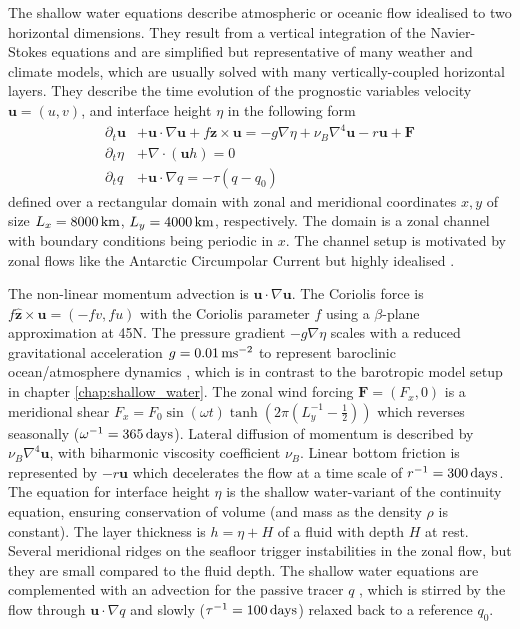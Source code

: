 The shallow water equations describe atmospheric or oceanic flow idealised to two horizontal dimensions. They result from
a vertical integration of the Navier-Stokes equations \citep{Gill1982,Vallis2006} and are simplified but representative of many
weather and climate models, which are usually solved with many vertically-coupled horizontal layers. They describe the time
evolution of the prognostic variables velocity $\mathbf{u} = (u,v)$, and interface height $\eta$  in the following form 
\begin{align}
\partial_t\mathbf{u} &+ \mathbf{u} \cdot \nabla \mathbf{u} + f\mathbf{z} \times \mathbf{u} =
-g\nabla \eta + \nu_B \nabla^4 \mathbf{u} - r \mathbf{u} + \mathbf{F} \nonumber \\
\partial_t\eta &+ \nabla \cdot (\mathbf{u}h) = 0 \nonumber \\ 
\partial_tq &+ \mathbf{u} \cdot \nabla q = -\tau(q-q_0)
\end{align}
defined over a rectangular domain with zonal and meridional coordinates $x,y$ of size $L_x = 8000\operatorname{km}$,
$L_y  = 4000\operatorname{km}$, respectively. The domain is a zonal channel with boundary conditions being periodic in $x$.
The channel setup is motivated by zonal flows like the Antarctic Circumpolar Current but highly idealised \citep{Jansen2015,Jansen2015a}.

The non-linear momentum advection is $\mathbf{u} \cdot \nabla\mathbf{u}$. The Coriolis force is
$f\mathbf{\hat{z}} \times \mathbf{u} = (-fv,fu)$ with the Coriolis parameter $f$ using a $\beta$-plane approximation at 45\textdegree{}N.
The pressure gradient $-g\nabla \eta$ scales with a reduced gravitational acceleration $g = 0.01\operatorname{ms}^{-2}$ to represent
baroclinic ocean/atmosphere dynamics \citep{Gill1982}, which is in contrast to the barotropic model setup in chapter \ref{chap:shallow_water}.
The zonal wind forcing $\mathbf{F} = (F_x,0)$ is a meridional shear $F_x = F_0\sin(\omega t) \tanh(2\pi(L_y^{-1} - \tfrac{1}{2}))$ which
reverses seasonally ($\omega^{-1} = 365\operatorname{days}$). Lateral diffusion of momentum is described by $\nu_B\nabla^4\mathbf{u}$, with
biharmonic viscosity coefficient $\nu_B$. Linear bottom friction is represented by $-r\mathbf{u}$ which decelerates the flow at a time
scale of $r^{-1} = 300\operatorname{days}$. The equation for interface height $\eta$ is the shallow water-variant of the continuity equation, ensuring
conservation of volume (and mass as the density $\rho$ is constant). The layer thickness is $h = \eta + H$ of a fluid with depth $H$ at rest.
Several meridional ridges on the seafloor trigger instabilities in the zonal flow, but they are small compared to the fluid depth.
The shallow water equations are complemented with an advection for the passive tracer $q$ , which is stirred by the flow
through $\mathbf{u} \cdot \nabla q$ and slowly ($\tau^{-1} = 100\operatorname{days}$) relaxed back to a reference $q_0$.

